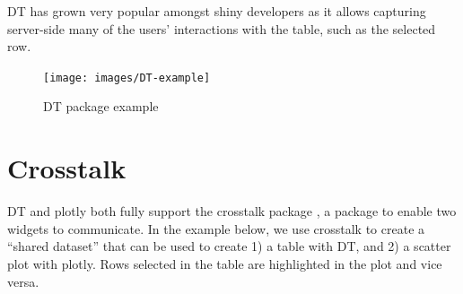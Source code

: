 \documentclass[
  10pt,
]{krantz}
\makeatletter
\newenvironment{Shaded}{\begin{snugshade}}{\end{snugshade}}
\newcommand{\ControlFlowTok}[1]{\textcolor[rgb]{0.27,0.27,0.27}{\textbf{#1}}}
\newcommand{\DecValTok}[1]{\textcolor[rgb]{0.06,0.06,0.06}{#1}}
\newcommand{\KeywordTok}[1]{\textcolor[rgb]{0.27,0.27,0.27}{\textbf{#1}}}
\newcommand{\NormalTok}[1]{#1}
\newcommand{\OperatorTok}[1]{\textcolor[rgb]{0.43,0.43,0.43}{\textbf{#1}}}
\newcommand{\StringTok}[1]{\textcolor[rgb]{0.5,0.5,0.5}{#1}}
\newenvironment{kframe}{%
\medskip{}
\setlength{\fboxsep}{.8em}
 \def\at@end@of@kframe{}%
 \ifinner\ifhmode%
  \def\at@end@of@kframe{\end{minipage}}%
  \begin{minipage}{\columnwidth}%
 \fi\fi%
 \def\FrameCommand##1{\hskip\@totalleftmargin \hskip-\fboxsep
 \colorbox{shadecolor}{##1}\hskip-\fboxsep
     \hskip-\linewidth \hskip-\@totalleftmargin \hskip\columnwidth}%
 \MakeFramed {\advance\hsize-\width
   \@totalleftmargin\z@ \linewidth\hsize
   \@setminipage}}%
 {\par\unskip\endMakeFramed%
 \at@end@of@kframe}
\renewenvironment{Shaded}{\begin{kframe}}{\end{kframe}}
\makeatother
\begin{document}
DT has grown very popular amongst shiny developers as it allows capturing server-side many of the users' interactions with the table, such as the selected row.

\begin{Shaded}
\end{Shaded}

\begin{figure}[H]

{\centering \texttt{[image: images/DT-example]} 

}

\caption{DT package example}\label{fig:dt-example}
\end{figure}

\hypertarget{widgets-intro-crosstalk}{%
\section{Crosstalk}\label{widgets-intro-crosstalk}}

DT and plotly both fully support the crosstalk package \citep{R-crosstalk}, a package to enable two widgets to communicate. In the example below, we use crosstalk to create a ``shared dataset'' that can be used to create 1) a table with DT, and 2) a scatter plot with plotly. Rows selected in the table are highlighted in the plot and vice versa.
\end{document}
